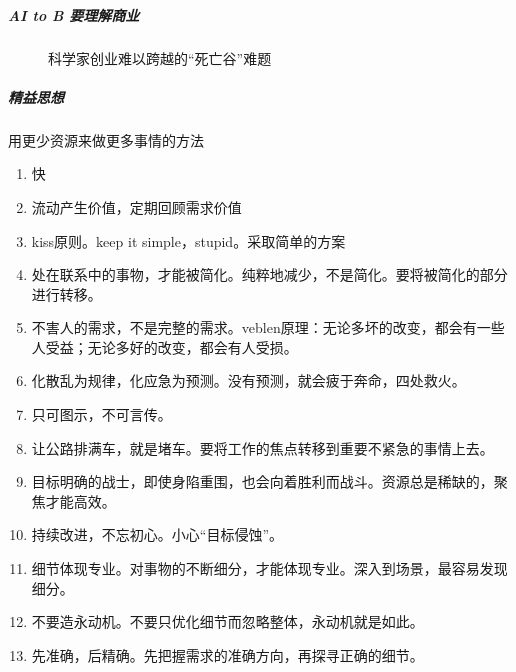 \documentclass[letterpaper,10pt,english]{sphinxmanual}
\begin{document}
\subparagraph{AI to B 要理解商业}
\label{\detokenize{chapter_idea/business:ai-to-b}}
\begin{figure}[H]
\centering
\capstart

\noindent{}
\caption{科学家创业难以跨越的“死亡谷”难题}\label{\detokenize{chapter_idea/business:id29}}\end{figure}


\subparagraph{精益思想}
\label{\detokenize{chapter_idea/business:id4}}
用更少资源来做更多事情的方法
\begin{enumerate}
%
\item {} 
快

\item {} 
流动产生价值，定期回顾需求价值

\item {} 
kiss原则。keep it simple，stupid。采取简单的方案

\item {} 
处在联系中的事物，才能被简化。纯粹地减少，不是简化。要将被简化的部分进行转移。

\item {} 
不害人的需求，不是完整的需求。veblen原理：无论多坏的改变，都会有一些人受益；无论多好的改变，都会有人受损。

\item {} 
化散乱为规律，化应急为预测。没有预测，就会疲于奔命，四处救火。

\item {} 
只可图示，不可言传。

\item {} 
让公路排满车，就是堵车。要将工作的焦点转移到重要不紧急的事情上去。

\item {} 
目标明确的战士，即使身陷重围，也会向着胜利而战斗。资源总是稀缺的，聚焦才能高效。

\item {} 
持续改进，不忘初心。小心“目标侵蚀”。

\item {} 
细节体现专业。对事物的不断细分，才能体现专业。深入到场景，最容易发现细分。

\item {} 
不要造永动机。不要只优化细节而忽略整体，永动机就是如此。

\item {} 
先准确，后精确。先把握需求的准确方向，再探寻正确的细节。

\end{enumerate}
\end{document}
